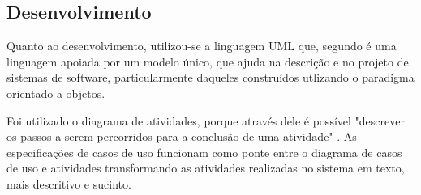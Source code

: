 \subsection{\textbf{Desenvolvimento}}

Quanto ao desenvolvimento, utilizou-se a linguagem UML que, segundo  é uma linguagem apoiada por um modelo único, que ajuda na descrição e no projeto de sistemas de software, particularmente daqueles construídos utlizando o paradigma orientado a objetos.

Foi utilizado o diagrama de atividades, porque através dele é possível "descrever os passos a serem percorridos para a conclusão de uma atividade"  \cite{guedes18}. As especificações de casos de uso funcionam como ponte entre o diagrama de casos de uso e atividades transformando as atividades realizadas no sistema em texto, mais descritivo e sucinto.

